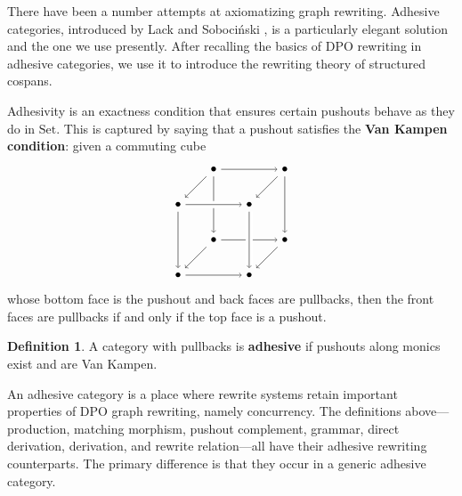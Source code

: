 \documentclass{amsart}
\newcommand{\Set}{\cat{Set}}
\newcommand{\defn}[1]{\textbf{#1}}
\newcommand{\cat}[1]{\mathrm{#1}}
\theoremstyle{remark}
\theoremstyle{definition}
\newtheorem{definition}[theorem]{Definition}
\begin{document}
There have been a number attempts at axiomatizing graph
rewriting. Adhesive categories, introduced by Lack and Soboci\'{n}ski
\cite{LackSobo_Adhesive}, is a particularly elegant solution and the
one we use presently. After recalling the basics of DPO rewriting in
adhesive categories, we use it to introduce the rewriting theory of
structured cospans.

Adhesivity is an exactness condition that ensures certain pushouts
behave as they do in $ \Set $. This is captured by saying that a
pushout satisfies the \defn{Van Kampen condition}: given a commuting cube
%
\[
  \begin{tikzpicture}
    \node (1) at (1,3) {\( \bullet \)};
    \node (2) at (0,2) {\( \bullet \)};
    \node (3) at (3,3) {\( \bullet \)};
    \node (4) at (2,2) {\( \bullet \)};
    \node (5) at (1,1) {\( \bullet \)};
    \node (6) at (0,0) {\( \bullet \)};
    \node (7) at (3,1) {\( \bullet \)};
    \node (8) at (2,0) {\( \bullet \)};
    \draw [->] (1) to node [] {\scriptsize{\(  \)}} (5);
    \draw [->] (1) to node [] {\scriptsize{\(  \)}} (2);
    \draw [->] (1) to node [] {\scriptsize{\(  \)}} (3);
    \draw [white, line width=2mm] (2) -- (4);
    \draw [->] (2) to node [] {\scriptsize{\(  \)}} (4);
    \draw [->] (3) to node [] {\scriptsize{\(  \)}} (4);
    \draw [->] (5) to node [] {\scriptsize{\(  \)}} (6);
    \draw [->] (5) to node [] {\scriptsize{\(  \)}} (7);
    \draw [->] (6) to node [] {\scriptsize{\(  \)}} (8);
    \draw [->] (7) to node [] {\scriptsize{\(  \)}} (8);
    \draw [->] (2) to node [] {\scriptsize{\(  \)}} (6);
    \draw [->] (3) to node [] {\scriptsize{\(  \)}} (7);
    \draw [white, line width=2mm] (4) -- (8);
    \draw [->] (4) to node [] {\scriptsize{\(  \)}} (8);
  \end{tikzpicture}
\]
% 
whose bottom face is the pushout and back faces are pullbacks, then
the front faces are pullbacks if and only if the top face is a pushout.

\begin{definition} \label{dfn:adhesive-category} 
  A category with pullbacks is \defn{adhesive} if pushouts along
  monics exist and are Van Kampen.
\end{definition} 

An adhesive category is a place where rewrite systems retain important
properties of DPO graph rewriting, namely concurrency. The definitions
above---production, matching morphism, pushout complement, grammar,
direct derivation, derivation, and rewrite relation---all have their
adhesive rewriting counterparts.  The primary difference is that they
occur in a generic adhesive category.
\end{document}
